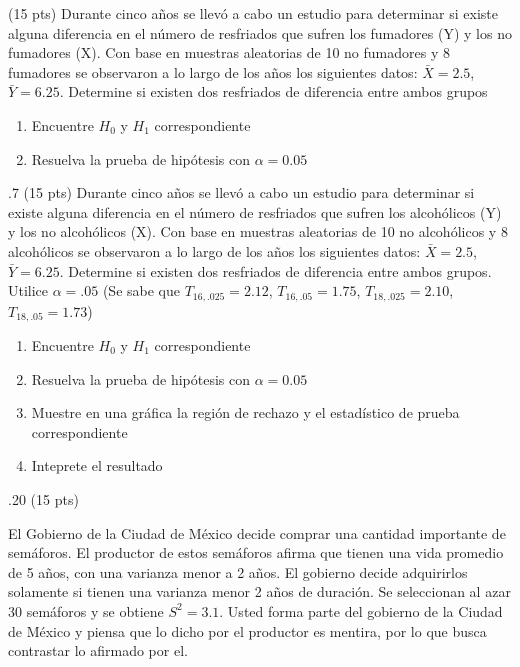 \documentclass[addpoints]{exam}
\theoremstyle{mytheor}
\begin{document}
  
\begin{questions} 


\question (15 pts) Durante cinco años se llevó a cabo un estudio para determinar si existe alguna diferencia en el número de resfriados que sufren los fumadores (Y) y los no fumadores (X). Con base en muestras aleatorias de 10 no fumadores y 8 fumadores se observaron a lo largo de los años los siguientes datos: $\bar{X} = 2.5$, $\bar{Y} = 6.25$. Determine si existen dos resfriados de diferencia entre ambos grupos

\begin{enumerate}
\item Encuentre $H_0$ y $H_1$ correspondiente
\item Resuelva la prueba de hipótesis con $\alpha=0.05$
\end{enumerate}

 
.7 (15 pts) Durante cinco años se llevó a cabo un estudio para determinar si existe alguna diferencia en el número de resfriados que sufren los alcohólicos (Y) y los no alcohólicos (X). Con base en muestras aleatorias de 10 no alcohólicos y 8 alcohólicos se observaron a lo largo de los años los siguientes datos: $\bar{X} = 2.5$, $\bar{Y} = 6.25$. Determine si existen dos resfriados de diferencia entre ambos grupos. Utilice $\alpha = .05$ (Se sabe que $T_{16,.025} = 2.12$, $T_{16,.05} = 1.75$, $T_{18,.025} = 2.10$, $T_{18,.05} = 1.73$)

\begin{enumerate}
\item Encuentre $H_0$ y $H_1$ correspondiente
\item Resuelva la prueba de hipótesis con $\alpha=0.05$
\item Muestre en una gráfica la región de rechazo y el estadístico de prueba correspondiente
\item Inteprete el resultado
\end{enumerate}
 
 
 .20 (15 pts)

El Gobierno de la Ciudad de México decide comprar una cantidad importante de semáforos. El productor de estos semáforos afirma que tienen una vida promedio de 5 años, con una varianza menor a 2 años. El gobierno decide adquirirlos solamente si tienen una varianza menor 2 años de duración. Se seleccionan al azar 30 semáforos y se obtiene $S^2 = 3.1$. Usted forma parte del gobierno de la Ciudad de México y piensa que lo dicho por el productor es mentira, por lo que busca contrastar lo afirmado por el.


\end{questions}
\end{document}
